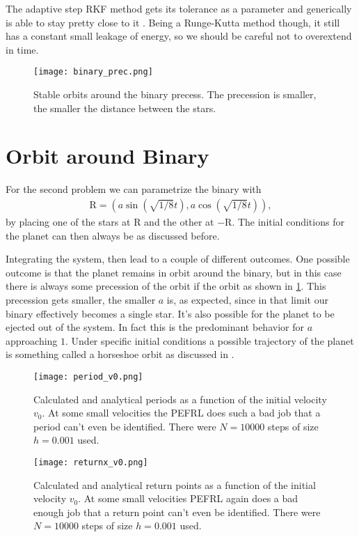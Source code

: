 \documentclass[10pt,a4paper,twocolumn]{article}
\renewcommand{\vec}[1]{\bm{\mathrm{#1}}}
\begin{document}
The adaptive step RKF method gets its tolerance as a parameter and generically is able to stay pretty close to it \cite{mfp_rkf}. Being a Runge-Kutta method though, it still has a constant small leakage of energy, so we should be careful not to overextend in time.

\begin{figure}[t]
    \centering
    \texttt{[image: binary\_prec.png]}
    \caption{Stable orbits around the binary precess. The precession is smaller, the smaller the distance between the stars.}
    \label{fig:binary_prec}
\end{figure}

\section{Orbit around Binary}

For the second problem we can parametrize the binary with
%
\begin{align}
    \vec{R} = \left( a \sin \left(\sqrt{1/8} t\right),  a \cos \left(\sqrt{1/8} t \right) \right),
\end{align}
%
by placing one of the stars at $\vec{R}$ and the other at $-\vec{R}$. The initial conditions for the planet can then always be as discussed before.

Integrating the system, then lead to a couple of different outcomes. One possible outcome is that the planet remains in orbit around the binary, but in this case there is always some precession of the orbit if the orbit as shown in \cref{fig:binary_prec}. This precession gets smaller, the smaller $a$ is, as expected, since in that limit our binary effectively becomes a single star. It's also possible for the planet to be ejected out of the system. In fact this is the predominant behavior for $a$ approaching $1$. Under specific initial conditions a possible trajectory of the planet is something called a horseshoe orbit as discussed in \cite{Christou_2011}.


\begin{figure}[t]
    \centering
    \texttt{[image: period\_v0.png]}
    \caption{Calculated and analytical periods as a function of the initial velocity $v_0$. At some small velocities the PEFRL does such a bad job that a period can't even be identified. There were $N=10 000$ steps of size $h=0.001$ used.}
    \label{fig:periods}
\end{figure}

\begin{figure}[t]
    \centering
    \texttt{[image: returnx\_v0.png]}
    \caption{Calculated and analytical return points as a function of the initial velocity $v_0$. At some small velocities PEFRL again does a bad enough job that a return point can't even be identified. There were $N=10 000$ steps of size $h=0.001$ used.}
    \label{fig:returnxs}
\end{figure}
\end{document}
